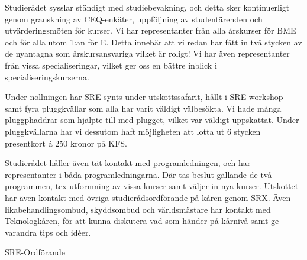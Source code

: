 \documentclass[../_main/handlingar.tex]{subfiles}
\begin{document}
\vspace{8px}

Studierådet sysslar ständigt med studiebevakning, och detta sker kontinuerligt genom granskning av CEQ-enkäter, uppföljning av studentärenden och utvärderingsmöten för kurser. Vi har representanter från alla årskurser för BME och för alla utom 1:an för E. Detta innebär att vi redan har fått in två stycken av de nyantagna som årskursansvariga vilket är roligt! Vi har även representanter från vissa specialiseringar, vilket ger oss en bättre inblick i specialiseringskurserna.

Under nollningen har SRE synts under utskottssafarit, hållt i SRE-workshop samt fyra pluggkvällar som alla har varit väldigt välbesökta. Vi hade många pluggphaddrar som hjälpte till med plugget, vilket var väldigt uppskattat. Under pluggkvällarna har vi dessutom haft möjligheten att lotta ut 6 stycken presentkort á 250 kronor på KFS. 

Studierådet håller även tät kontakt med programledningen, och har representanter i båda programledningarna. Där tas beslut gällande de två programmen, tex utformning av vissa kurser samt väljer in nya kurser. Utskottet har även kontakt med övriga studierådsordförande på kåren genom SRX. Även likabehandlingsombud, skyddsombud och världsmästare har kontakt med Teknologkåren, för att kunna diskutera vad som händer på kårnivå samt ge varandra tips och idéer. 


\begin{signatures}{1}
    \mvh
    \signature{Lina Samnegård}{SRE-Ordförande}
\end{signatures}
\end{document}
